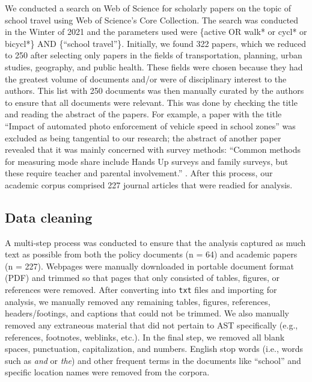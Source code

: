 \documentclass[preprint, 3p,
authoryear]{elsarticle} %
\begin{document}
We conducted a search on Web of Science for scholarly papers on the
topic of school travel using Web of Science's Core Collection. The
search was conducted in the Winter of 2021 and the parameters used were
\{active OR walk* or cycl* or bicycl*\} AND \{``school travel''\}.
Initially, we found 322 papers, which we reduced to 250 after selecting
only papers in the fields of transportation, planning, urban studies,
geography, and public health. These fields were chosen because they had
the greatest volume of documents and/or were of disciplinary interest to
the authors. This list with 250 documents was then manually curated by
the authors to ensure that all documents were relevant. This was done by
checking the title and reading the abstract of the papers. For example,
a paper with the title ``Impact of automated photo enforcement of
vehicle speed in school zones'' \citep{quistberg2019impact} was excluded
as being tangential to our research; the abstract of another paper
revealed that it was mainly concerned with survey methods: ``Common
methods for measuring mode share include Hands Up surveys and family
surveys, but these require teacher and parental involvement.''
\citep{sersli2019getting}. After this process, our academic corpus
comprised 227 journal articles that were readied for analysis.

\hypertarget{data-cleaning}{%
\subsection{Data cleaning}\label{data-cleaning}}

A multi-step process was conducted to ensure that the analysis captured
as much text as possible from both the policy documents (n = 64) and
academic papers (n = 227). Webpages were manually downloaded in portable
document format (PDF) and trimmed so that pages that only consisted of
tables, figures, or references were removed. After converting into
\texttt{txt} files and importing for analysis, we manually removed any
remaining tables, figures, references, headers/footings, and captions
that could not be trimmed. We also manually removed any extraneous
material that did not pertain to AST specifically (e.g., references,
footnotes, weblinks, etc.). In the final step, we removed all blank
spaces, punctuation, capitalization, and numbers. English stop words
(i.e., words such as \emph{and} or \emph{the}) and other frequent terms
in the documents like ``school'' and specific location names were
removed from the corpora.
\end{document}
